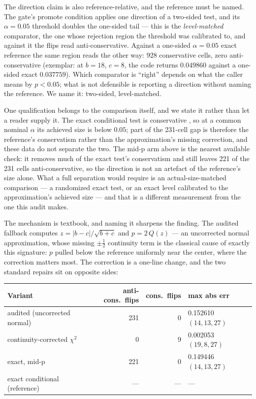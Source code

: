 \documentclass[10pt]{article}
\begin{document}
The direction claim is also reference-relative, and the reference must be
named. The gate's promote condition applies one direction of a two-sided
test, and its $\alpha{=}0.05$ threshold doubles the one-sided tail --- this
is the \emph{level-matched} comparator, the one whose rejection region the
threshold was calibrated to, and against it the flips read anti-conservative.
Against a one-sided $\alpha{=}0.05$ exact reference the same region reads the
other way: 928 conservative cells, zero anti-conservative (exemplar: at
$b{=}18$, $c{=}8$, the code returns $0.049860$ against a one-sided exact
$0.037759$). Which comparator is ``right'' depends on what the caller means
by $p<0.05$; what is not defensible is reporting a direction without naming
the reference. We name it: two-sided, level-matched.

One qualification belongs to the comparison itself, and we state it rather
than let a reader supply it. The exact conditional test is conservative
\citep{fagerland2013mcnemar}, so at a common nominal $\alpha$ its achieved size
is below $0.05$; part of the 231-cell gap is therefore the reference's
conservatism rather than the approximation's missing correction, and these
data do not separate the two. The mid-p arm above is the nearest available
check: it removes much of the exact test's conservatism and still leaves 221
of the 231 cells anti-conservative, so the direction is not an artefact of the
reference's size alone. What a full separation would require is an
actual-size-matched comparison --- a randomized exact test, or an exact level
calibrated to the approximation's achieved size --- and that is a different
measurement from the one this audit makes.

The mechanism is textbook, and naming it sharpens the finding. The audited
fallback computes $z = |b-c|/\sqrt{b+c}$ and $p = 2\,Q(z)$ --- an uncorrected
normal approximation, whose missing $\pm\tfrac12$ continuity term is the
classical cause of exactly this signature: $p$ pulled below the reference
uniformly near the center, where the correction matters most. The correction
is a one-line change, and the two standard repairs sit on opposite sides:

\begin{center}
\begin{tabular}{lrrl}
\toprule
Variant & anti-cons.\ flips & cons.\ flips & max abs err \\
\midrule
audited (uncorrected normal) & 231 & 0 & 0.152610 \; $(14,13,27)$ \\
continuity-corrected $\chi^2$ & 0 & 9 & 0.002053 \; $(19,8,27)$ \\
exact, mid-p & 221 & 0 & 0.149446 \; $(14,13,27)$ \\
exact conditional (reference) & --- & --- & --- \\
\bottomrule
\end{tabular}
\end{center}
\end{document}
